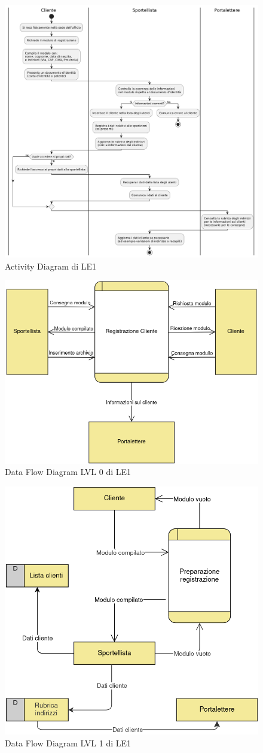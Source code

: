\begin{figure}[H]
  \centering
  \includegraphics[width=0.8\linewidth]{assets/activitydiagram_LE1.png}
  \caption{Activity Diagram di LE1}
\end{figure}
\begin{figure}[H]
  \centering
  \includegraphics[width=0.7\linewidth]{assets/dataflow_lvl0_LE1.png}
  \caption{Data Flow Diagram LVL 0 di LE1}
\end{figure}
\begin{figure}[H]
  \centering
  \includegraphics[width=0.7\linewidth]{assets/dataflow_lvl1_LE1.png}
  \caption{Data Flow Diagram LVL 1 di LE1}
\end{figure}

